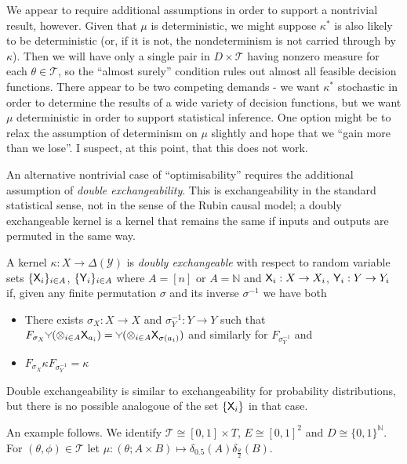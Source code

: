 We appear to require additional assumptions in order to support a nontrivial result, however. Given that $\mu$ is deterministic, we might suppose $\kappa^*$ is also likely to be deterministic (or, if it is not, the nondeterminism is not carried through by $\kappa$). Then we will have only a single pair in $D\times \mathscr{T}$ having nonzero measure for each $\theta \in \mathscr{T}$, so the ``almost surely'' condition rules out almost all feasible decision functions. There appear to be two competing demands - we want $\kappa^*$ stochastic in order to determine the results of a wide variety of decision functions, but we want $\mu$ deterministic in order to support statistical inference. One option might be to relax the assumption of determinism on $\mu$ slightly and hope that we ``gain more than we lose''. I suspect, at this point, that this does not work.

An alternative nontrivial case of ``optimisability'' requires the additional assumption of \emph{double exchangeability}. This is exchangeability in the standard statistical sense, not in the sense of the Rubin causal model; a doubly exchangeable kernel is a kernel that remains the same if inputs and outputs are permuted in the same way.

\begin{definition}
A kernel $\kappa:X\to \Delta(\mathcal{Y})$ is \emph{doubly exchangeable} with respect to random variable sets $\{\mathsf{X}_i\}_{i\in A}$, $\{\mathsf{Y}_i\}_{i\in A}$ where $A=[n]$ or $A=\mathbb{N}$ and $\mathsf{X}_i:X\to X_i$, $\mathsf{Y}_i:Y\to Y_i$ if, given any finite permutation $\sigma$ and its inverse $\sigma^{-1}$ we have both
\begin{itemize}
	\item There exists $\sigma_X:X\to X$ and $\sigma^{-1}_Y:Y\to Y$ such that $F_{\sigma_X}\splitter{0.1}(\otimes_{i\in A} \RV{X}_{a_i}) = \splitter{0.1}(\otimes_{i\in A} \RV{X}_{\sigma(a_i)})$ and similarly for $F_{\sigma^{-1}_Y}$ and
	\item $F_{\sigma_X}\kappa F_{\sigma^{-1}_Y} = \kappa$
\end{itemize}

Double exchangeability is similar to exchangeability for probability distributions, but there is no possible analogoue of the set $\{\mathsf{X}_i\}$ in that case.
\end{definition}


An example follows. We identify $\mathscr{T}\cong[0,1]\times T$, $E\cong [0,1]^2$ and $D\cong\{0,1\}^{\mathbb{N}}$. For $(\theta,\phi)\in \mathscr{T}$ let $\mu:(\theta;A\times B)\mapsto \delta_{0.5}(A)\delta_{\frac{\theta}{2}}(B)$.

